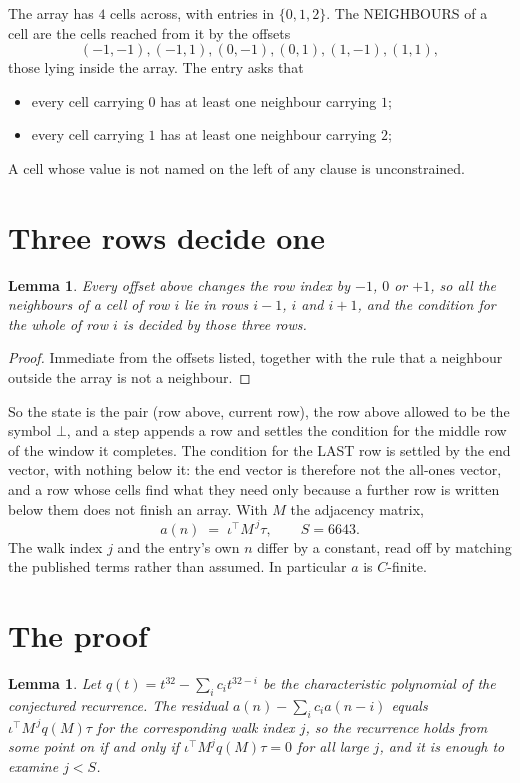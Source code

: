 \documentclass[11pt,a4paper]{article}
\theoremstyle{plain}
\newtheorem{lemma}[theorem]{Lemma}
\theoremstyle{definition}
\begin{document}
The array has $4$ cells across, with entries in $\{0,1,2\}$. The NEIGHBOURS of a cell are the
cells reached from it by the offsets
\[
(-1,-1), (-1,1), (0,-1), (0,1), (1,-1), (1,1),
\]
those lying inside the array. The entry asks that
\begin{itemize}
\item every cell carrying $0$ has at least one neighbour carrying $1$;
\item every cell carrying $1$ has at least one neighbour carrying $2$;

\end{itemize}
A cell whose value is not named on the left of any clause is unconstrained.

\section{Three rows decide one}

\begin{lemma}\label{lem:win}
Every offset above changes the row index by $-1$, $0$ or $+1$, so all the neighbours of a cell
of row $i$ lie in rows $i-1$, $i$ and $i+1$, and the condition for the whole of row $i$ is
decided by those three rows.
\end{lemma}

\begin{proof}
Immediate from the offsets listed, together with the rule that a neighbour outside the array is
not a neighbour.
\end{proof}

So the state is the pair (row above, current row), the row above allowed to be the symbol
$\bot$, and a step appends a row and settles the condition for the middle row of the window it
completes. The condition for the LAST row is settled by the end vector, with nothing below it:
the end vector is therefore not the all-ones vector, and a row whose cells find what they need
only because a further row is written below them does not finish an array. With $M$ the
adjacency matrix,
\[
a(n)\;=\;\iota^{\!\top}M^{\,j}\tau ,\qquad S=6643.
\]
The walk index $j$ and the entry's own $n$ differ by a constant, read off by matching the
published terms rather than assumed. In particular $a$ is $C$-finite.

\section{The proof}

\begin{lemma}\label{lem:crit}
Let $q(t)=t^{32}-\sum_i c_it^{32-i}$ be the characteristic polynomial of the
conjectured recurrence. The residual $a(n)-\sum_ic_ia(n-i)$ equals
$\iota^{\!\top}M^{\,j}q(M)\tau$ for the corresponding walk index $j$, so the recurrence
holds from some point on if and only if $\iota^{\!\top}M^{j}q(M)\tau=0$ for all large $j$,
and it is enough to examine $j<S$.
\end{lemma}
\end{document}

